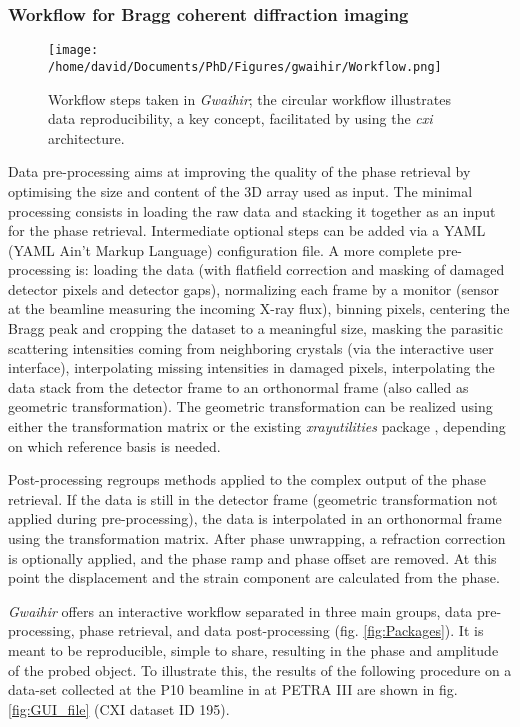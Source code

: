 \subsubsection{Workflow for Bragg coherent diffraction imaging} \label{sec:Workflow}

\begin{figure}[!htb]
    \centering
    \texttt{[image: /home/david/Documents/PhD/Figures/gwaihir/Workflow.png]}
    \caption{Workflow steps taken in \textit{Gwaihir}; the circular workflow illustrates data reproducibility, a key concept, facilitated by using the \textit{cxi} architecture.}
    \label{fig:Workflow}
\end{figure}

Data pre-processing aims at improving the quality of the phase retrieval by optimising the size and content of the 3D array used as input.
The minimal processing consists in loading the raw data and stacking it together as an input for the phase retrieval.
Intermediate optional steps can be added via a YAML (YAML Ain't Markup Language) configuration file.
A more complete pre-processing is: loading the data (with flatfield correction and masking of damaged detector pixels and detector gaps), normalizing each frame by a monitor (sensor at the beamline measuring the incoming X-ray flux), binning pixels, centering the Bragg peak and cropping the dataset to a meaningful size, masking the parasitic scattering intensities coming from neighboring crystals (via the interactive user interface), interpolating missing intensities in damaged pixels, interpolating the data stack from the detector frame to an orthonormal frame (also called as geometric transformation).
The geometric transformation can be realized using either the transformation matrix \parencite{thesismark} or the existing  \textit{xrayutilities} package \parencite{kriegner_xrayutilities_2013}, depending on which reference basis is needed.

Post-processing regroups methods applied to the complex output of the phase retrieval. If the data is still in the detector frame (geometric transformation not applied during pre-processing), the data is interpolated in an orthonormal frame using the transformation matrix.
After phase unwrapping, a refraction correction is optionally applied, and the phase ramp and phase offset are removed.
At this point the displacement and the strain component are calculated from the phase.

\textit{Gwaihir} offers an interactive workflow separated in three main groups, data pre-processing, phase retrieval, and data post-processing (fig. \ref{fig:Packages}). It is meant to be reproducible, simple to share, resulting in the phase and amplitude of the probed object. To illustrate this, the results of the following procedure on a data-set collected at the P10 beamline in at PETRA III are shown in fig. \ref{fig:GUI_file} (CXI dataset ID 195).

